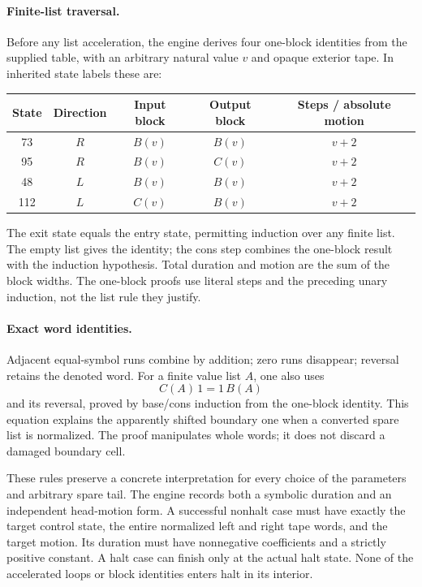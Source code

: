 \paragraph{Finite-list traversal.}
Before any list acceleration, the engine derives four one-block
identities from the supplied table, with an arbitrary natural value $v$
and opaque exterior tape. In inherited state labels these are:
\begin{center}
\begin{tabular}{ccccc}
\toprule
State & Direction & Input block & Output block & Steps / absolute motion \\
\midrule
73 & $R$ & $B(v)$ & $B(v)$ & $v+2$ \\
95 & $R$ & $B(v)$ & $C(v)$ & $v+2$ \\
48 & $L$ & $B(v)$ & $B(v)$ & $v+2$ \\
112 & $L$ & $C(v)$ & $B(v)$ & $v+2$ \\
\bottomrule
\end{tabular}
\end{center}
The exit state equals the entry state, permitting induction over any
finite list. The empty list gives the identity; the cons step combines
the one-block result with the induction hypothesis. Total duration and
motion are the sum of the block widths. The one-block proofs use literal
steps and the preceding unary induction, not the list rule they justify.

\paragraph{Exact word identities.}
Adjacent equal-symbol runs combine by addition; zero runs disappear;
reversal retains the denoted word. For a finite value list $A$, one also
uses
\[
                         C(A)\,1=1\,B(A)
\]
and its reversal, proved by base/cons induction from the one-block
identity. This equation explains the apparently shifted boundary one
when a converted spare list is normalized. The proof manipulates whole
words; it does not discard a damaged boundary cell.

These rules preserve a concrete interpretation for every choice of the
parameters and arbitrary spare tail. The engine records both a symbolic
duration and an independent head-motion form. A successful nonhalt case
must have exactly the target control state, the entire normalized left
and right tape words, and the target motion. Its duration must have
nonnegative coefficients and a strictly positive constant. A halt case
can finish only at the actual halt state. None of the accelerated loops
or block identities enters halt in its interior.

